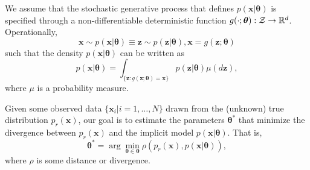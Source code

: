 \documentclass[twocolumn,superscriptaddress,aps]{revtex4-1}
\newcommand{\bftheta}{{\bm \theta}}
\newcommand{\bfx}{\mathbf{x}}
\newcommand{\bfz}{\mathbf{z}}
\theoremstyle{plain}
\begin{document}
We assume that the stochastic generative process that defines $p(\mathbf{x}|\bftheta)$ is
specified through a non-differentiable deterministic function $g(\cdot; \bftheta) : {\cal Z} \to
\mathbb{R}^d$. Operationally, %
\begin{equation}\label{eqn:p_theta}
    \mathbf{x} \sim p(\mathbf{x}|\bftheta) \equiv \bfz \sim p(\bfz|\bftheta), \mathbf{x} = g(\bfz; \bftheta)
\end{equation}
such that the density $p(\mathbf{x}|\bftheta)$ can be
written as
\begin{equation}\label{eqn:p_x_sim}
    p(\mathbf{x}|\bftheta) = \int_{\{\bfz:g(\bfz;\bftheta) = \bfx \}} p(\bfz|\bftheta) \mu(d\bfz),
\end{equation}
where $\mu$ is a probability measure.

Given some observed data $\{ \mathbf{x}_i | i=1, \dots, N \}$ drawn from the
(unknown) true distribution $p_r(\mathbf{x})$, our goal is to estimate the parameters
$\bftheta^*$ that minimize the divergence between $p_r(\mathbf{x})$ and
the implicit model $p(\mathbf{x}|\bftheta)$. That is,
\begin{equation}
    \bftheta^* = \arg \min_{\bftheta \in \bftheta} \rho(p_r(\mathbf{x}), p(\mathbf{x}|\bftheta)),
\end{equation}
where $\rho$ is some distance or divergence.


\end{document}

